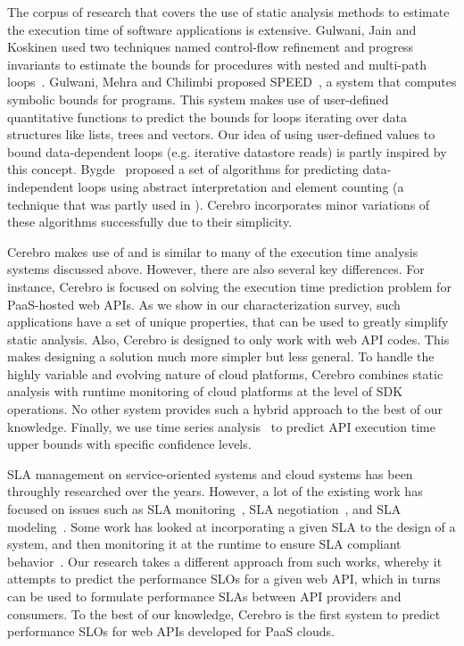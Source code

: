 The corpus of research that covers the use of static analysis methods 
to estimate the execution time of software applications is 
extensive. Gulwani, Jain and Koskinen used two techniques named control-flow
 refinement and progress invariants to estimate the bounds for procedures with nested and multi-path loops~\cite{Gulwani:2009:CRP:1542476.1542518}.
 Gulwani, Mehra and Chilimbi proposed SPEED~\cite{Gulwani:2009:SPE:1480881.1480898}, a system that computes symbolic bounds for programs. This
 system makes use of user-defined quantitative functions to predict the bounds for loops iterating over
data structures like lists, trees and vectors. Our idea of using user-defined values to bound
 data-dependent loops (e.g. iterative datastore reads) is partly inspired by this concept.
 Bygde~\cite{bygde2010static} proposed a set of algorithms for predicting data-independent loops using abstract interpretation
 and element counting (a technique that was partly used in \cite{ermedahl2007loop}). 
Cerebro incorporates minor variations of these algorithms successfully due to their
simplicity.  
 
Cerebro makes use of and is similar to many of the execution time analysis 
systems discussed above.  However, there are also several key differences. 
For instance, Cerebro is focused on solving the
execution time prediction problem for PaaS-hosted web APIs. 
As we show in our characterization survey, such applications 
have a set of unique properties, that can be used to greatly simplify static analysis.
Also, Cerebro is designed to only work with web API codes. This makes designing 
a solution much more simpler but less general.
To handle the highly variable and evolving nature of
cloud platforms, Cerebro combines static analysis with runtime
monitoring of cloud platforms at the level of SDK operations. No other 
system provides such a hybrid approach to the best of our knowledge. 
Finally,
we use time series analysis~\cite{Nurmi:2007:QQB:1791551.1791556} 
to predict API execution time upper bounds with specific confidence
levels.

SLA management on service-oriented systems and cloud systems has been 
throughly researched
over the years. However, a lot of the existing work has focused on issues 
such as SLA monitoring~\cite{Michlmayr:2009:CQM:1657755.1657756,Tripathy:2011:MMS:1980822.1980832,Raimondi:2008:EOM:1453101.1453125,Bertolino:2007:SUS:1294904.1294914}, SLA negotiation~\cite{Mahbub:2011:PSN:2061042.2062022,Yaqub:2014:ONS:2680847.2681496,6546098}, and SLA modeling~\cite{Chau:2008:ASM:1463788.1463802,Stamou:2013:SGM:2516588.2516592,Skene:2004:PSL:998675.999422}. 
Some work has looked at incorporating a given SLA to the design of a system, and
then monitoring it at the runtime to ensure SLA compliant behavior~\cite{He:2013:TSC:2532443.2532449}. 
Our research takes a
different approach from such works, whereby it attempts to predict the performance SLOs for a
given web API, which in turns can be used to formulate performance SLAs between API providers
and consumers. To the best of our knowledge, Cerebro is the first system to predict performance 
SLOs for web APIs developed for PaaS clouds.

